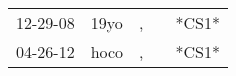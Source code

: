 \begin{supertabular}{lllll}
 12-29-08 &  19yo &  , &   &  *CS1* \\
 04-26-12 &  hoco &  , &   &  *CS1* \\
\end{supertabular}
